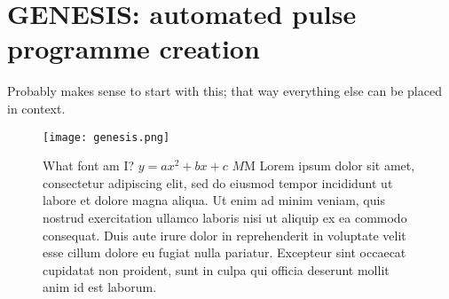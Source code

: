 \section{GENESIS: automated pulse programme creation}

Probably makes sense to start with this; that way everything else can be placed in context.

\begin{figure}[ht]
    \centering
    \texttt{[image: genesis.png]}
    \caption[Short version]{
        What font am I? $y = ax^2 + bx + c$ $M$M
        Lorem ipsum dolor sit amet, consectetur adipiscing elit, sed do eiusmod tempor incididunt ut labore et dolore magna aliqua. Ut enim ad minim veniam, quis nostrud exercitation ullamco laboris nisi ut aliquip ex ea commodo consequat. Duis aute irure dolor in reprehenderit in voluptate velit esse cillum dolore eu fugiat nulla pariatur. Excepteur sint occaecat cupidatat non proident, sunt in culpa qui officia deserunt mollit anim id est laborum.
    }
\end{figure}
